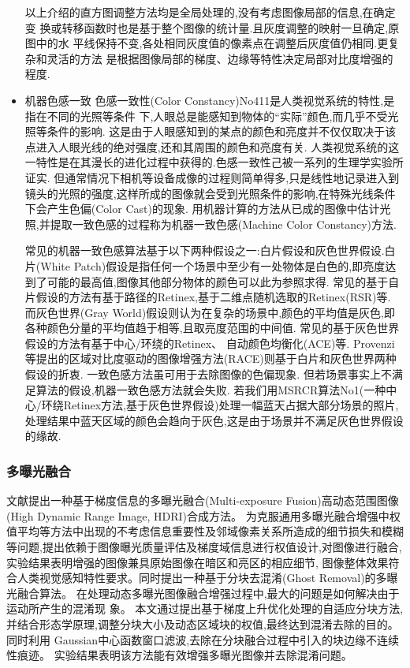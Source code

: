 \message{ !name(main.tex)}\documentclass{amsart}
\begin{document}
\begin{itemize}
以上介绍的直方图调整方法均是全局处理的,没有考虑图像局部的信息,在确定变
换或转移函数时也是基于整个图像的统计量.且灰度调整的映射一旦确定,原图中的水
平线保持不变,各处相同灰度值的像素点在调整后灰度值仍相同.更复杂和灵活的方法
是根据图像局部的梯度、边缘等特性决定局部对比度增强的程度.


\item 机器色感一致
色感一致性(Color Constancy)No411是人类视觉系统的特性,是指在不同的光照等条件
下,人眼总是能感知到物体的“实际”颜色,而几乎不受光照等条件的影响.
这是由于人眼感知到的某点的颜色和亮度并不仅仅取决于该点进入人眼光线的绝对强度,还和其周围的颜色和亮度有关.
人类视觉系统的这一特性是在其漫长的进化过程中获得的.色感一致性己被一系列的生理学实验所证实.
但通常情况下相机等设备成像的过程则简单得多,只是线性地记录进入到镜头的光照的强度,这样所成的图像就会受到光照条件的影响,在特殊光线条件下会产生色偏(Color Cast)的现象.
用机器计算的方法从已成的图像中估计光照,并提取一致色感的过程称为机器一致色感(Machine Color Constancy)方法.

常见的机器一致色感算法基于以下两种假设之一:白片假设和灰色世界假设.白片(White Patch)假设是指任何一个场景中至少有一处物体是白色的,即亮度达到了可能的最高值,图像其他部分物体的颜色可以此为参照求得.
常见的基于自片假设的方法有基于路径的Retinex,基于二维点随机选取的Retinex(RSR)等.
而灰色世界(Gray World)假设则认为在复杂的场景中,颜色的平均值是灰色,即各种颜色分量的平均值趋于相等,且取亮度范围的中间值.
常见的基于灰色世界假设的方法有基于中心/环绕的Retinex、
自动颜色均衡化(ACE)等.
Provenzi等提出的区域对比度驱动的图像增强方法(RACE)则基于白片和灰色世界两种假设的折衷.
一致色感方法虽可用于去除图像的色偏现象.
但若场景事实上不满足算法的假设,机器一致色感方法就会失败.
若我们用MSRCR算法No1(一种中心/环绕Retinex方法,基于灰色世界假设)处理一幅蓝天占据大部分场景的照片,处理结果中蓝天区域的颜色会趋向于灰色,这是由于场景并不满足灰色世界假设的缘故.
\end{itemize}


\subsubsection{多曝光融合}
\label{sec:0203}

文献\cite{李艳梅}提出一种基于梯度信息的多曝光融合(Multi-exposure Fusion)高动态范围图像(High Dynamic Range Image, HDRI)合成方法。
为克服通用多曝光融合增强中权值平均等方法中出现的不考虑信息重要性及邻域像素关系所造成的细节损失和模糊等问题,提出依赖于图像曝光质量评估及梯度域信息进行权值设计,对图像进行融合,实验结果表明增强的图像兼具原始图像在暗区和亮区的相应细节,
图像整体效果符合人类视觉感知特性要求。同时提出一种基于分块去混淆(Ghost Removal)的多曝光融合算法。
在处理动态多曝光图像融合增强过程中,最大的问题是如何解决由于运动所产生的混淆现
象。
本文通过提出基于梯度上升优化处理的自适应分块方法,并结合形态学原理,调整分块大小及动态区域块的权值,最终达到混淆去除的目的。
同时利用 Gaussian中心函数窗口滤波,去除在分块融合过程中引入的块边缘不连续性痕迹。
实验结果表明该方法能有效增强多曝光图像并去除混淆问题。
\end{document}
